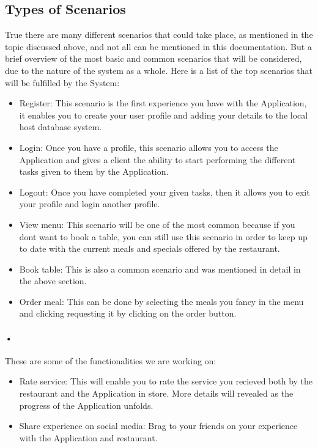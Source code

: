 \documentclass{article}
\begin{document}
\subsection{{Types of Scenarios}}
True there are many different scenarios that could take place, as mentioned in the topic discussed above, and not all can be mentioned in this documentation. But a brief overview of the most basic and common scenarios that will be considered, due to the nature of the system as a whole. Here is a list of the top scenarios that will be fulfilled by the System:
\begin{itemize}
\item Register: This scenario is the first experience you have with the Application, it enables you to create your user profile and adding your details to the local host database system.
\item Login: Once you have a profile, this scenario allows you to access the Application and gives a client the ability to start performing the different tasks given to them by the Application. 
\item Logout: Once you have completed your given tasks, then it allows you to exit your profile and login another profile.
\item View menu: This scenario will be one of the most common because if you dont want to book a table, you can still use this scenario in order to keep up to date with the current meals and specials offered by the restaurant.
\item Book table: This is also a common scenario and was mentioned in detail in the above section.
\item Order meal: This can be done by selecting the meals you fancy in the menu and clicking requesting it by clicking on the order button. 
\end{itemize}
\paragraph{•}
These are some of the functionalities we are working on:
\begin{itemize}
\item Rate service: This will enable you to rate the service you recieved both by the restaurant and the Application in store. More details will revealed as the progress of the Application unfolds.
\item Share experience on social media: Brag to your friends on your experience with the Application and restaurant.
\end{itemize}
\end{document}
